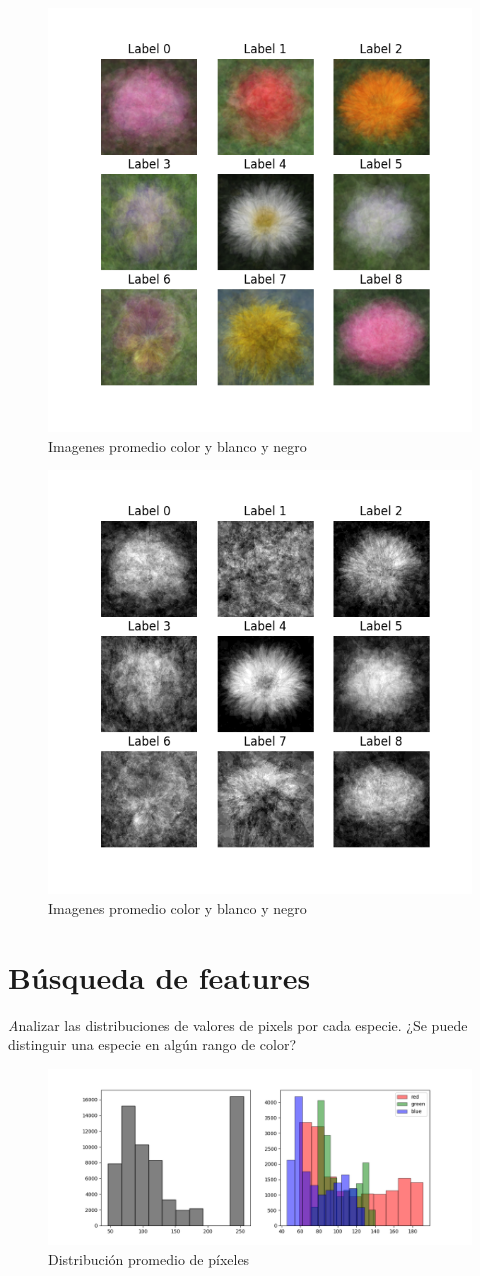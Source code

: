 \documentclass{article}
\begin{document}
\begin{figure}[h!]
  \centering    
  \includegraphics[width=.6\textwidth]{7_2_promedio_especies_color.png}
  \caption{Imagenes promedio color y blanco y negro}
\end{figure}

\begin{figure}[h!]
  \centering    
  \includegraphics[width=.6\textwidth]{7_3_promedio_especies_bn.png}
  \caption{Imagenes promedio color y blanco y negro}
\end{figure}
\pagebreak
\section{Búsqueda de features}

{\emph Analizar las distribuciones de valores de pixels por cada especie. ¿Se puede distinguir
una especie en algún rango de color?}

\begin{figure}[h!]
  \centering    
  \includegraphics[width=1\textwidth]{8_1_pixeles_general.png}
  \caption{Distribución promedio de píxeles}
\end{figure}
\end{document}
